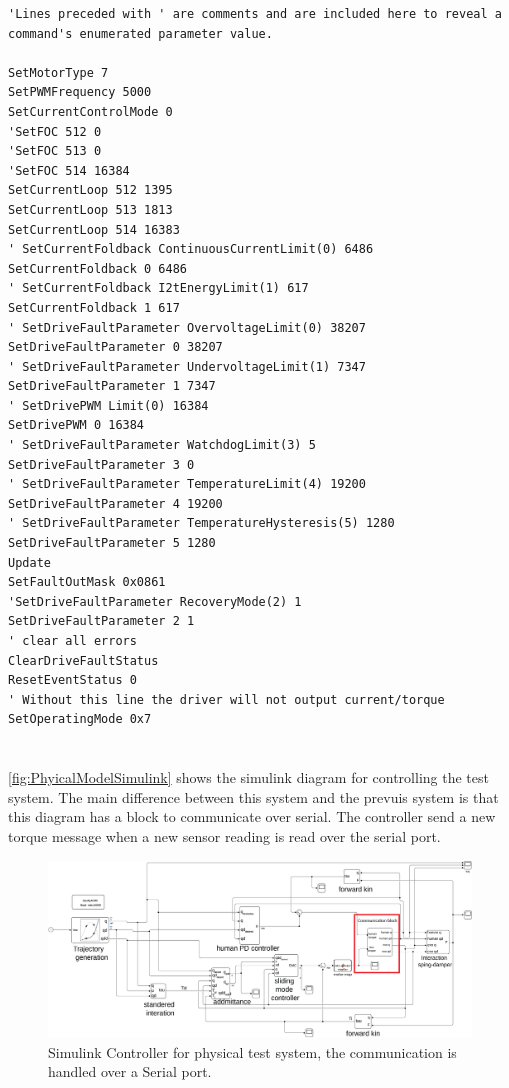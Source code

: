\begin{lstlisting}
'Lines preceded with ' are comments and are included here to reveal a command's enumerated parameter value.

SetMotorType 7
SetPWMFrequency 5000
SetCurrentControlMode 0
'SetFOC 512 0 
'SetFOC 513 0 
'SetFOC 514 16384 
SetCurrentLoop 512 1395 
SetCurrentLoop 513 1813 
SetCurrentLoop 514 16383 
' SetCurrentFoldback ContinuousCurrentLimit(0) 6486 
SetCurrentFoldback 0 6486 
' SetCurrentFoldback I2tEnergyLimit(1) 617 
SetCurrentFoldback 1 617 
' SetDriveFaultParameter OvervoltageLimit(0) 38207 
SetDriveFaultParameter 0 38207 
' SetDriveFaultParameter UndervoltageLimit(1) 7347 
SetDriveFaultParameter 1 7347 
' SetDrivePWM Limit(0) 16384 
SetDrivePWM 0 16384 
' SetDriveFaultParameter WatchdogLimit(3) 5 
SetDriveFaultParameter 3 0 
' SetDriveFaultParameter TemperatureLimit(4) 19200 
SetDriveFaultParameter 4 19200 
' SetDriveFaultParameter TemperatureHysteresis(5) 1280 
SetDriveFaultParameter 5 1280 
Update 
SetFaultOutMask 0x0861
'SetDriveFaultParameter RecoveryMode(2) 1 
SetDriveFaultParameter 2 1 
' clear all errors
ClearDriveFaultStatus
ResetEventStatus 0
' Without this line the driver will not output current/torque
SetOperatingMode 0x7

\end{lstlisting}

\chapter{}

\autoref{fig:PhyicalModelSimulink} shows the simulink diagram for controlling the test system. The main difference between this system and the prevuis system is that this diagram has a block to communicate over serial. The controller send a new torque message when a new sensor reading is read over the serial port.

 \begin{figure}[h]
     \centering
     \includegraphics[width=\textwidth]{images/appendix/phyical_system_simulink.png}
     \caption[Simulink Controller]{Simulink Controller for physical test system, the communication is handled over a Serial port.}
     \label{fig:PhyicalModelSimulink}
\end{figure}


